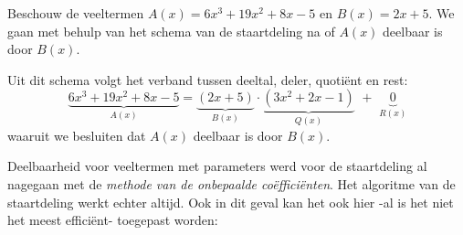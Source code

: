 \documentclass{ximera}
\begin{document}
	\begin{example} 
	Beschouw de veeltermen \(A(x) = 6x^3 + 19x^2 + 8x - 5\) en \(B(x) = 2x+5\). We gaan met behulp van het schema van de staartdeling na of \(A(x)\) deelbaar is door \(B(x)\). 
	
	
	Uit dit schema volgt het verband tussen deeltal, deler, quotiënt en rest:
	\[
	\underbrace{6x^3 + 19x^2 + 8x - 5}_{A(x)} = \underbrace{(2x+5)}_{B(x)}\cdot\underbrace{(3x^2+2x-1)}_{Q(x)} \,\, + \,\, \underbrace{0}_{R(x)} 
	\]
	waaruit we besluiten dat \(A(x)\) deelbaar is door \(B(x)\).
	\end{example} 


Deelbaarheid voor veeltermen met parameters werd voor de staartdeling al nagegaan met de \textit{methode van de onbepaalde coëfficiënten}. Het algoritme van de staartdeling werkt echter altijd. Ook in dit geval kan het ook hier -al is het niet het meest efficiënt-  toegepast worden: 
\end{document}
